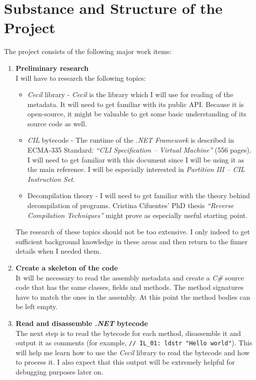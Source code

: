 \section*{Substance and Structure of the Project}
The project consists of the following major work items:
\begin{enumerate}
\newcommand{\milestone}[1]{\item \textbf{#1} \\}

\milestone{Preliminary research}
I will have to research the following topics:
\begin{itemize}
	\item {\emph{Cecil} library}
		- \emph{Cecil} is the library which I will use for reading of the 
		metadata.  It will need to get familiar with its public API.
		Because it is open-source, it might be valuable to get some basic 
		understanding of its source code as well.
	\item {\emph{CIL} bytecode}
		- The runtime of the \emph{.NET Framework} is described in 
		ECMA-335 Standard: \emph{``CLI Specification -- Virtual Machine''} 
		(556 pages).  I will need to get familiar with this document since 
		I will be using it as the main reference.  I will be especially 
		interested in \emph{Partition III -- CIL Instruction Set}.
	\item {Decompilation theory} - I will need to get familiar with the 
		theory behind decompilation of programs.  Cristina Cifuentes' 
		PhD thesis \emph{``Reverse Compilation Techniques''} might prove as 
		especially useful starting point.
\end{itemize}

The research of these topics should not be too extensive.  I only indeed to 
get sufficient background knowledge in these areas and then return to the 
finner details when I needed them.

\milestone{Create a skeleton of the code}
It will be necessary to read the assembly metadata and create a \emph{C\#} 
source code that has the same classes, fields and methods.  The method 
signatures have to match the ones in the assembly.  At this point the method 
bodies can be left empty.

\milestone{Read and disassemble \emph{.NET} bytecode}
The next step is to read the bytecode for each method, disassemble it and 
output it as comments (for example, \verb|// IL_01: ldstr "Hello world"|).  
This will help me learn how to use the \emph{Cecil} library to read the 
bytecode and how to process it.  I also expect that this output will be 
extremely helpful for debugging purposes later on.


\end{enumerate}

